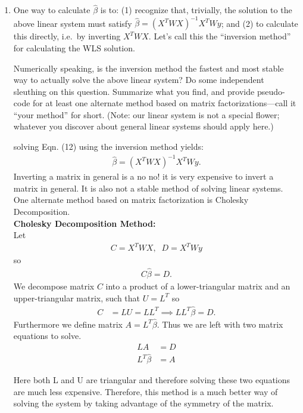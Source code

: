 \documentclass{article}
\begin{document}
\begin{enumerate}[label=(\Alph*)]
{}






\item One way to calculate $\hat{\beta}$ is to: (1) recognize that, trivially, the solution to the above linear system must satisfy $\hat \beta = (X^T W X)^{-1} X^T W y$; and (2) to calculate this directly, i.e.~by inverting $X^T W X$.  Let's call this the ``inversion method'' for calculating the WLS solution.


Numerically speaking, is the inversion method the fastest and most stable way to actually solve the above linear system?  Do some independent sleuthing on this question.  Summarize what you find, and provide pseudo-code for at least one alternate method based on matrix factorizations---call it ``your method'' for short.  (Note: our linear system is not a special flower; whatever you discover about general linear systems should apply here.)

\bigskip
{\color{blue}
solving Eqn. (12) using the inversion method yields:
		\begin{align}
			\hat{\beta} = (X^TWX)^{-1}X^TWy.
		\end{align} 
		Inverting a matrix in general is a no no! it is very expensive
		to invert a matrix in general. It is also not a stable method of
		solving linear systems. One alternate method based on matrix
		factorization is Cholesky Decomposition.\\

			\textbf{Cholesky Decomposition Method:} \\
			Let 
			\begin{align}
				C = X^TWX, \;\;D=X^TWy
			\end{align}
			so 
			\begin{align}
				C\hat{\beta} = D.
			\end{align}
			We decompose matrix $C$ into a product of a lower-triangular matrix and an upper-triangular matrix, such that $U=L^T$ so
			\begin{align}
				C &= LU = LL^T \implies 
				LL^T\hat{\beta} = D.
			\end{align}
			Furthermore we define matrix $A = L^T\hat{\beta}$. Thus we are left with two matrix equations to solve. 
			\begin{align}
				LA &= D \\
				L^T\hat{\beta} &= A
			\end{align}
			
			Here both L and U are triangular and therefore solving these two equations are much less expensive. Therefore, this method 
			is a much better way of solving the system by taking advantage of the symmetry of the matrix.
		
}
\end{enumerate}
\end{document}
